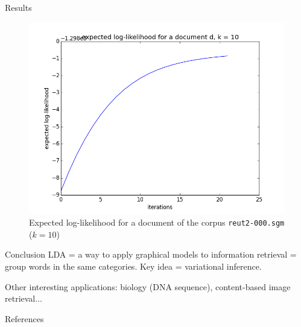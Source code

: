\documentclass[final]{beamer}
\newlength{\onecolwid}
\begin{document}
\begin{frame}[t]
\begin{columns}[t]
\begin{column}{\onecolwid}
\begin{block}{Results}
\begin{figure}[ht!]
\begin{center}
\includegraphics[width=0.5\linewidth]{../img/k=10/log_likelihood_document_k=10.png}
\caption{Expected log-likelihood for a document of the corpus \texttt{reut2-000.sgm} ($k=10$)}
\end{center}
\end{figure}

\end{block}


\begin{block}{Conclusion}
LDA = a way to apply graphical models to information retrieval = group words in the same categories. Key idea = variational inference. 

Other interesting applications: biology (DNA sequence), content-based image retrieval$\ldots$
\end{block}


\begin{block}{References}

\nocite{*} %
\small{
\vspace{0.75in}}

\end{block}



\end{column}
\end{columns}
\end{frame}
\end{document}

